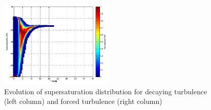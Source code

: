 \documentclass[12pt]{article}
\begin{document}
\begin{figure}[H]
\includegraphics[width=0.48\textwidth]{Figures/pdf_supersat_f3}
\caption{Evolution of supersaturation distribution for decaying turbulence (left column) and forced turbulence (right column)}
\end{figure}




\end{document}

